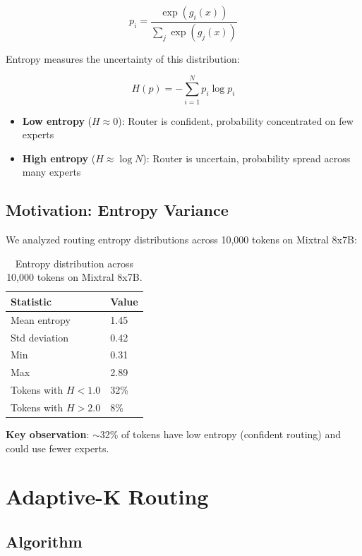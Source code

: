 \documentclass{article}
\begin{document}
\begin{equation}
p_i = \frac{\exp(g_i(x))}{\sum_j \exp(g_j(x))}
\end{equation}

Entropy measures the uncertainty of this distribution:

\begin{equation}
H(p) = -\sum_{i=1}^{N} p_i \log p_i
\end{equation}

\begin{itemize}
    \item \textbf{Low entropy} ($H \approx 0$): Router is confident, probability concentrated on few experts
    \item \textbf{High entropy} ($H \approx \log N$): Router is uncertain, probability spread across many experts
\end{itemize}

\subsection{Motivation: Entropy Variance}

We analyzed routing entropy distributions across 10,000 tokens on Mixtral 8x7B:

\begin{table}[h]
\centering
\begin{tabular}{ll}
\toprule
\textbf{Statistic} & \textbf{Value} \\
\midrule
Mean entropy & 1.45 \\
Std deviation & 0.42 \\
Min & 0.31 \\
Max & 2.89 \\
Tokens with $H < 1.0$ & 32\% \\
Tokens with $H > 2.0$ & 8\% \\
\bottomrule
\end{tabular}
\caption{Entropy distribution across 10,000 tokens on Mixtral 8x7B.}
\label{tab:entropy_dist}
\end{table}

\textbf{Key observation}: $\sim$32\% of tokens have low entropy (confident routing) and could use fewer experts.

\section{Adaptive-K Routing}

\subsection{Algorithm}
\end{document}
